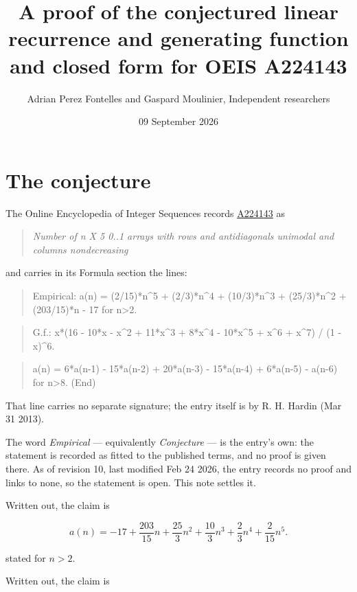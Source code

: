 \documentclass[11pt]{article}
\title{A proof of the conjectured linear recurrence and generating function and closed form for OEIS A224143}
\author{Adrian Perez Fontelles and Gaspard Moulinier, Independent researchers}
\date{09 September 2026}
\theoremstyle{definition}
\begin{document}
\maketitle
\section{The conjecture}

The Online Encyclopedia of Integer Sequences records \href{https://oeis.org/A224143}{A224143} as

\begin{quote}\itshape Number of n X 5 0..1 arrays with rows and antidiagonals unimodal and columns nondecreasing\end{quote}

and carries in its Formula section the lines:

\begin{quote}\ttfamily Empirical: a(n) = (2/15)*n\textasciicircum{}5 + (2/3)*n\textasciicircum{}4 + (10/3)*n\textasciicircum{}3 + (25/3)*n\textasciicircum{}2 + (203/15)*n - 17 for n>2.\end{quote}

\begin{quote}\ttfamily G.f.: x*(16 - 10*x - x\textasciicircum{}2 + 11*x\textasciicircum{}3 + 8*x\textasciicircum{}4 - 10*x\textasciicircum{}5 + x\textasciicircum{}6 + x\textasciicircum{}7) / (1 - x)\textasciicircum{}6.\end{quote}

\begin{quote}\ttfamily a(n) = 6*a(n-1) - 15*a(n-2) + 20*a(n-3) - 15*a(n-4) + 6*a(n-5) - a(n-6) for n>8. (End)\end{quote}

That line carries no separate signature; the entry itself is by R. H. Hardin (Mar 31 2013).

The word {\itshape Empirical} --- equivalently {\itshape Conjecture} --- is the entry's own: the statement is recorded as fitted to the published terms, and no proof is given there. As of revision 10, last modified Feb 24 2026, the entry records no proof and links to none, so the statement is open. This note settles it.

Written out, the claim is

\[a(n) = -17 + \frac{203}{15}n + \frac{25}{3}n^{2} + \frac{10}{3}n^{3} + \frac{2}{3}n^{4} + \frac{2}{15}n^{5}.\]

stated for $n > 2$.

Written out, the claim is
\end{document}
